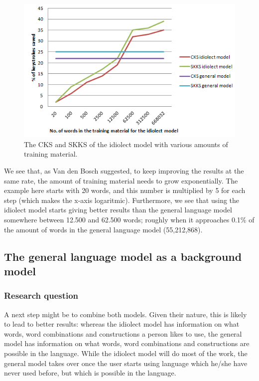 \documentclass[11pt]{article}
\begin{document}
\begin{figure}[H] \centering
\includegraphics[scale=1]{lcurve}
\caption{The CKS and SKKS of the idiolect model with various amounts of training material.}
\label{lcurve}
\end{figure} 

We see that, as Van den Bosch  suggested, to keep improving the results at the same rate, the amount of training material needs to grow exponentially. The example here starts with 20 words, and this number is multiplied by 5 for each step (which makes the x-axis logaritmic). Furthermore, we see that using the idiolect model starts giving better results  than the general language model somewhere between 12.500 and 62.500 words; roughly when it approaches 0.1\% of the amount of words in the general language model (55,212,868).

\subsection{The general language model as a background model} \label{background}

\subsubsection{Research question}

A next step might be to combine both models. Given their nature, this is likely to lead to better results: whereas the idiolect model has information on what words, word combinations and constructions a person likes to use, the general model has information on what words, word combinations and constructions are possible in the language. While the idiolect model will do most of the work, the general model takes over once the user starts using language which he/she have never used before, but which is possible in the language. 
\end{document}
